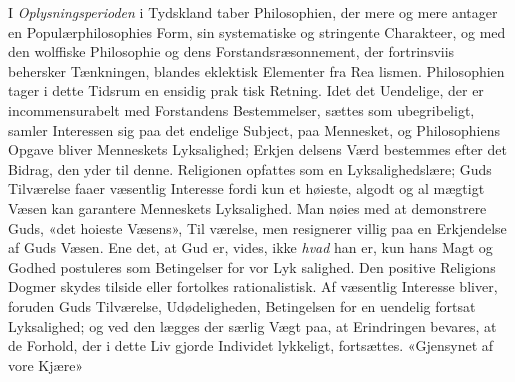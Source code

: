 \documentclass[12pt,a4paper]{book}
\begin{document}
I \emph{Oplysningsperioden} i Tydskland taber Philosophien,
der mere og mere antager en Populærphilosophies Form, sin
systematiske og stringente Charakteer, og med den wolffiske
Philosophie og dens Forstandsræsonnement, der fortrinsviis
behersker Tænkningen, blandes eklektisk Elementer fra Rea\-%
lismen. Philosophien tager i dette Tidsrum en ensidig prak\-%
tisk Retning. Idet det Uendelige, der er incommensurabelt
med Forstandens Bestemmelser, sættes som ubegribeligt, samler
Interessen sig paa det endelige Subject, paa Mennesket, og
Philosophiens Opgave bliver Menneskets Lyksalighed; Erkjen\-%
delsens Værd bestemmes efter det Bidrag, den yder til denne.
Religionen opfattes som en Lyksalighedslære; Guds Tilværelse
faaer væsentlig Interesse fordi kun et høieste, algodt og al\-%
mægtigt Væsen kan garantere Menneskets Lyksalighed. Man
nøies med at demonstrere Guds, «det hoieste Væsens», Til\-%
værelse, men resignerer villig paa en Erkjendelse af Guds
Væsen. Ene det, at Gud er, vides, ikke \emph{hvad} han er, kun
hans Magt og Godhed postuleres som Betingelser for vor Lyk\-%
salighed. Den positive Religions Dogmer skydes tilside eller
fortolkes rationalistisk. Af væsentlig Interesse bliver, foruden
Guds Tilværelse, Udødeligheden, Betingelsen for en uendelig
fortsat Lyksalighed; og ved den lægges der særlig Vægt paa,
at Erindringen bevares, at de Forhold, der i dette Liv gjorde
Individet lykkeligt, fortsættes. «Gjensynet af vore Kjære»
\end{document}
